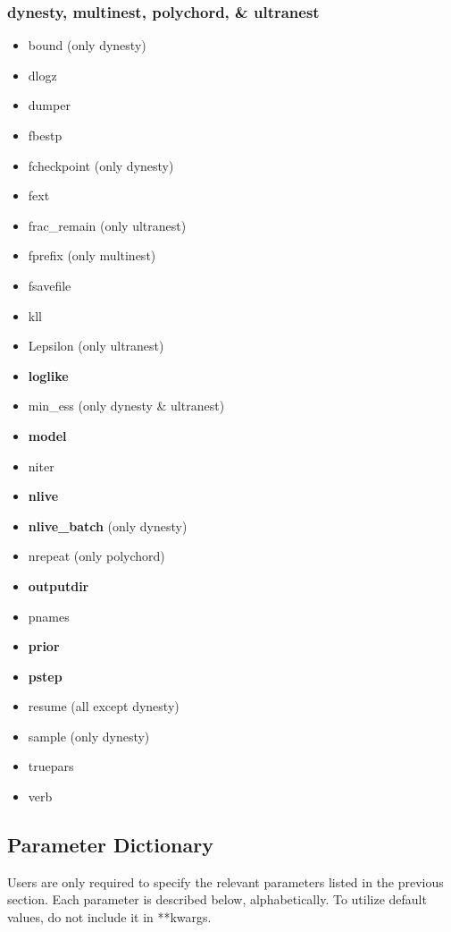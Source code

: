 \documentclass[letterpaper, 12pt]{article}
\begin{document}
\subsubsection{dynesty, multinest, polychord, \& ultranest}
\label{sec:ns-inputs}
\begin{itemize}
\item bound (only dynesty)
\item dlogz
\item dumper
\item fbestp
\item fcheckpoint (only dynesty)
\item fext
\item frac\_remain (only ultranest)
\item fprefix (only multinest)
\item fsavefile
\item kll
\item Lepsilon (only ultranest)
\item \textbf{loglike}
\item min\_ess (only dynesty \& ultranest)
\item \textbf{model}
\item niter
\item \textbf{nlive}
\item \textbf{nlive\_batch} (only dynesty)
\item nrepeat (only polychord)
\item \textbf{outputdir}
\item pnames
\item \textbf{prior}
\item \textbf{pstep}
\item resume (all except dynesty)
\item sample (only dynesty)
\item truepars
\item verb
\end{itemize}

\subsection{Parameter Dictionary}
\label{sec:param-desc}

Users are only required to specify the relevant parameters listed in 
the previous section.  Each parameter is described below, alphabetically.
To utilize default values, do not include it in **kwargs.
\end{document}
